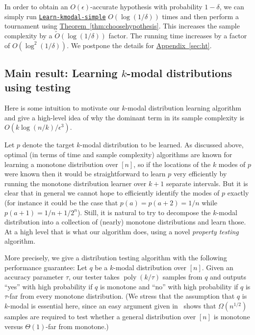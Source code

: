 \documentclass[10pt]{article}
\theoremstyle{definition}
\numberwithin{equation}{section}
\newcommand{\expref}[2]{\texorpdfstring{\hyperref[#2]{#1~\ref{#2}}}{#1~\ref{#2}}}
\newcommand{\algorithml}[1]{{\normalfont\texttt{#1}}}
\newcommand{\eps}{\epsilon}
\newcommand{\poly}{\operatorname{poly}}
\begin{document}
%
%
%
In order to obtain
%
an $O(\eps)$-accurate hypothesis with probability $1-\delta$, we
can simply run \hyperref[alg:learn-kmodal-simple]{\algorithml{Learn-{\allowbreak}kmodal-{\allowbreak}simple}} $O(\log(1/\delta))$ times
and then perform a tournament using \expref{Theorem}{thm:choosehypothesis}.
This increases the sample complexity by a $\tilde{O}(\log(1/\delta))$ factor.
The running time increases by a factor of $O(\log^2(1/\delta))$.
We postpone the details for \expref{Appendix}{sec:ht}.



\subsection{Main result: Learning \texorpdfstring{$k$-modal}{k-modal} distributions using testing} \label{ssec:kmodal-learn}

Here is some intuition to motivate our $k$-modal distribution learning algorithm
and give a high-level idea of why the dominant term in its sample complexity is
$O(k\log(n/k)/\eps^3)$.

Let $p$ denote the target $k$-modal distribution to be learned.
As discussed above, optimal (in terms of time and sample complexity) algorithms are known
for learning a monotone distribution over $[n]$, so if the locations of the
$k$ modes of $p$ were known then it would be straightforward to learn $p$ very efficiently
by running the monotone distribution learner over $k+1$ separate intervals.  But it is clear that
in general we cannot hope to efficiently identify the modes of $p$ exactly (for instance it could
be the case that $p(a)=p(a+2)=1/n$ while $p(a+1) = 1/n + 1/2^n$).  Still, it is natural to try to
decompose the $k$-modal distribution into a collection of (nearly) monotone  distributions
and learn those.  At a high level that is what our algorithm does, using a novel \emph{property testing}
algorithm.

%

More precisely, we give a distribution testing algorithm with the following performance guarantee:
Let $q$ be a $k$-modal distribution over $[n]$.  Given an accuracy parameter $\tau$, our tester takes $\poly(k/\tau)$ samples from $q$ and outputs ``yes''
with high probability if $q$ is {monotone} and ``no'' with high probability
if $q$ is $\tau$-far from every monotone distribution.
(We stress that the assumption that $q$ is $k$-modal is essential here, since
an easy argument given in~\cite{BKR:04long} shows that $\Omega(n^{1/2})$ samples are required to test
whether a general distribution over $[n]$ is monotone versus $\Theta(1)$-far from monotone.)
\end{document}
